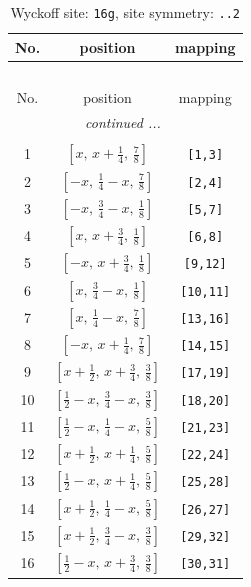 \documentclass[fleqn,8pt]{jsarticle}
\begin{document}
\renewcommand{\arraystretch}{1.2}
\begin{longtable}{ccc}
\caption{Wyckoff site: {\tt 16g}, site symmetry: {\tt ..2}}
 \\
 \hline \hline
No. & position & mapping \\ \hline \endfirsthead

\multicolumn{2}{l}{\tablename\ \thetable{}} \\
 \hline \hline
No. & position & mapping \\ \hline \endhead

 \hline \hline
\multicolumn{2}{r}{\footnotesize\it continued ...} \\ \endfoot

 \hline \hline
\multicolumn{2}{r}{} \\ \endlastfoot

1 & $\left[ x,\, x + \frac{1}{4},\, \frac{7}{8} \right]$ & {\tt [1,3]} \\ \hline
2 & $\left[ - x,\, \frac{1}{4} - x,\, \frac{7}{8} \right]$ & {\tt [2,4]} \\ \hline
3 & $\left[ - x,\, \frac{3}{4} - x,\, \frac{1}{8} \right]$ & {\tt [5,7]} \\ \hline
4 & $\left[ x,\, x + \frac{3}{4},\, \frac{1}{8} \right]$ & {\tt [6,8]} \\ \hline
5 & $\left[ - x,\, x + \frac{3}{4},\, \frac{1}{8} \right]$ & {\tt [9,12]} \\ \hline
6 & $\left[ x,\, \frac{3}{4} - x,\, \frac{1}{8} \right]$ & {\tt [10,11]} \\ \hline
7 & $\left[ x,\, \frac{1}{4} - x,\, \frac{7}{8} \right]$ & {\tt [13,16]} \\ \hline
8 & $\left[ - x,\, x + \frac{1}{4},\, \frac{7}{8} \right]$ & {\tt [14,15]} \\ \hline
9 & $\left[ x + \frac{1}{2},\, x + \frac{3}{4},\, \frac{3}{8} \right]$ & {\tt [17,19]} \\ \hline
10 & $\left[ \frac{1}{2} - x,\, \frac{3}{4} - x,\, \frac{3}{8} \right]$ & {\tt [18,20]} \\ \hline
11 & $\left[ \frac{1}{2} - x,\, \frac{1}{4} - x,\, \frac{5}{8} \right]$ & {\tt [21,23]} \\ \hline
12 & $\left[ x + \frac{1}{2},\, x + \frac{1}{4},\, \frac{5}{8} \right]$ & {\tt [22,24]} \\ \hline
13 & $\left[ \frac{1}{2} - x,\, x + \frac{1}{4},\, \frac{5}{8} \right]$ & {\tt [25,28]} \\ \hline
14 & $\left[ x + \frac{1}{2},\, \frac{1}{4} - x,\, \frac{5}{8} \right]$ & {\tt [26,27]} \\ \hline
15 & $\left[ x + \frac{1}{2},\, \frac{3}{4} - x,\, \frac{3}{8} \right]$ & {\tt [29,32]} \\ \hline
16 & $\left[ \frac{1}{2} - x,\, x + \frac{3}{4},\, \frac{3}{8} \right]$ & {\tt [30,31]} \\
\end{longtable}
\end{document}
